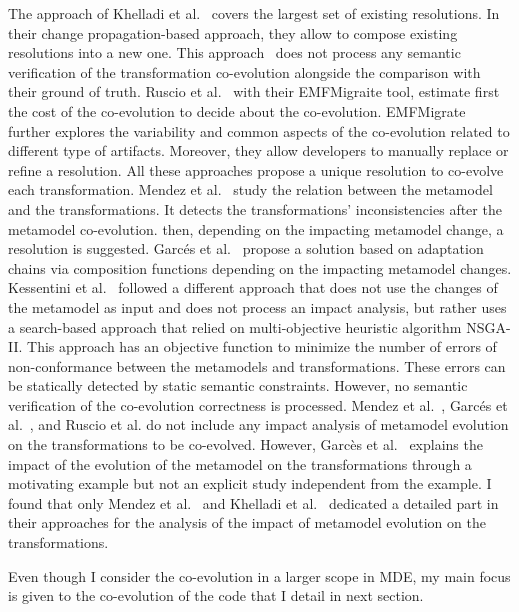The approach of Khelladi et al.~\cite{khelladi2018change} covers the largest set of existing resolutions. In their change propagation-based approach, they allow to compose existing resolutions into a new one. This approach~\cite{khelladi2018change} does not process any semantic verification of the transformation co-evolution alongside the comparison with their ground of truth. Ruscio et al.~\cite{di2011needed} with their EMFMigraite tool, estimate first the cost of the co-evolution to decide about the co-evolution. EMFMigrate further explores the variability and common aspects of the co-evolution related to different type of artifacts. Moreover, they allow developers to manually replace or refine a resolution. All these approaches propose a unique resolution to co-evolve each transformation. Mendez et al.~\cite{mendez2010towards} study the relation between the metamodel and the transformations. It detects the transformations' inconsistencies after the metamodel co-evolution. then, depending on the impacting metamodel change, a resolution is suggested.
Garcés et al.~\cite{garces2014adapting} propose a solution based on adaptation chains via composition functions depending on the impacting metamodel changes.
Kessentini et al.~\cite{kessentini2018automated} followed a different approach that does not use the changes of the metamodel as input and does not process an impact analysis, but rather uses a search-based approach that relied on multi-objective heuristic algorithm NSGA-II. This approach has an objective function to minimize the number of errors of non-conformance between the metamodels and transformations. These errors can be statically detected by static semantic constraints. However, no semantic verification of the co-evolution correctness is processed.
Mendez et al.~\cite{mendez2010towards}, Garcés et al.~\cite{garces2014adapting}, and Ruscio et al. \cite{di2011needed} do not include any impact analysis of metamodel evolution on the transformations to be co-evolved. However, Garcès et al.~\cite{garces2014adapting} explains the impact of the evolution of the metamodel on the transformations through a motivating example but not an explicit study independent from the example. 
I found that only Mendez et al.~\cite{mendez2010towards} and Khelladi et al.~\cite{khelladi2018change} dedicated a detailed part in their approaches for the analysis of the impact of metamodel evolution on the transformations.

Even though I consider the co-evolution in a larger scope in MDE, my main focus is given to the co-evolution of the code that I detail in next section.

